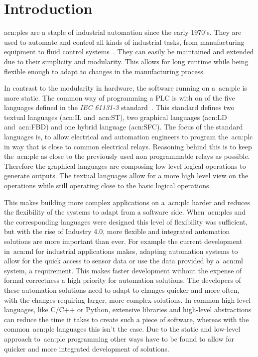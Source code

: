
\section{Introduction}
\label{sec:Introduction}

\glspl{acn:plc} are a staple of industrial automation since the early 1970's.
They are used to automate and control all kinds of industrial tasks, from manufacturing equipment to fluid control systems~\cite{Erickson:1996aa}.
They can easily be maintained and extended due to their simplicity and modularity.
This allows for long runtime while being flexible enough to adapt to changes in the manufacturing process.

In contrast to the modularity in hardware, the software running on a~\gls{acn:plc} is more static.
The common way of programming a PLC is with on of the five languages defined in the \textit{IEC 61131-3} standard~\cite{Plcopen:61131-3}.
This standard defines two textual languages (\gls{acn:IL} and~\gls{acn:ST}), two graphical languages (\gls{acn:LD} and~\gls{acn:FBD}) and one hybrid language (\gls{acn:SFC}).
The focus of the standard languages is, to allow electrical and automation engineers to program the~\gls{acn:plc} in way that is close to common electrical relays.
Reasoning behind this is to keep the~\gls{acn:plc} as close to the previously used non programmable relays as possible.
Therefore the graphical languages are composing low level logical operations to generate outputs.
The textual languages allow for a more high level view on the operations while still operating close to the basic logical operations.

This makes building more complex applications on a~\gls{acn:plc} harder and reduces the flexibility of the systems to adapt from a software side.
When~\glspl{acn:plc} and the corresponding languages were designed this level of flexibility was sufficient, but with the rise of Industry 4.0, more flexible and integrated automation solutions are more important than ever.
For example the current development in~\gls{acn:ml} for industrial applications makes, adapting automation systems to allow for the quick access to sensor data or use the data provided by a~\gls{acn:ml} system, a requirement.
This makes faster development without the expense of formal correctness a high priority for automation solutions.
The developers of these automation solutions need to adapt to changes quicker and more often, with the changes requiring larger, more complex solutions.
In common high-level languages, like C/C++ or Python, extensive libraries and high-level abstractions can reduce the time it takes to create such a piece of software, whereas with the common~\gls{acn:plc} languages this isn't the case.
Due to the static and low-level approach to~\gls{acn:plc} programming other ways have to be found to allow for quicker and more integrated development of solutions.

